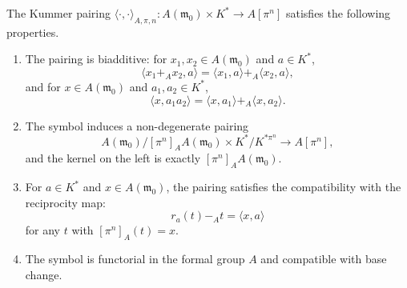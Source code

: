 \begin{proposition}
The Kummer pairing $\langle \cdot, \cdot \rangle_{A,\pi,n} : A(\mathfrak{m}_0) \times K^{*} \to A[\pi^n]$ satisfies the following properties.

\begin{enumerate}
\item The pairing is biadditive: for $x_1, x_2 \in A(\mathfrak{m}_0)$ and $a \in K^{*}$,
$$\langle x_1 +_A x_2, a \rangle = \langle x_1, a \rangle +_A \langle x_2, a \rangle,$$
and for $x \in A(\mathfrak{m}_0)$ and $a_1, a_2 \in K^{*}$,
$$\langle x, a_1 a_2 \rangle = \langle x, a_1 \rangle +_A \langle x, a_2 \rangle.$$

\item The symbol induces a non-degenerate pairing
$$A(\mathfrak{m}_0) / [\pi^n]_A A(\mathfrak{m}_0) \times K^{*} / K^{* \pi^n} \to A[\pi^n],$$
and the kernel on the left is exactly $[\pi^n]_A A(\mathfrak{m}_0)$.

\item For $a \in K^{*}$ and $x \in A(\mathfrak{m}_0)$, the pairing satisfies the compatibility with the reciprocity map:
$$r_a(t) -_A t = \langle x, a \rangle$$
for any $t$ with $[\pi^n]_A(t) = x$.

\item The symbol is functorial in the formal group $A$ and compatible with base change.
\end{enumerate}
\end{proposition}
